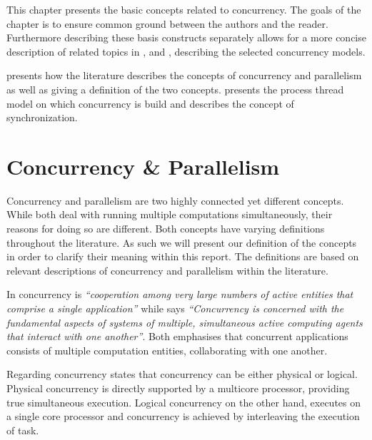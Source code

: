 \makeatletter {}\makeatother
{}
This chapter presents the basic concepts related to concurrency. The goals of the chapter is to ensure common ground between the authors and the reader. Furthermore describing these basis constructs separately allows for a more concise description of related topics in ,  and , describing the selected concurrency models. 

 presents how the literature describes the concepts of concurrency and parallelism as well as giving a definition of the two concepts.  presents the process thread model on which concurrency is build and  describes the concept of synchronization.
\section{Concurrency \& Parallelism}\label{sec:concurrency_parallelism}
Concurrency and parallelism are two highly connected yet different concepts. While both deal with running multiple computations simultaneously, their reasons for doing so are different. Both concepts have varying definitions throughout the literature. As such we will present our definition of the concepts in order to clarify their meaning within this report. The definitions are based on relevant descriptions of concurrency and parallelism within the literature.

In \cite[p. 330]{papadopoulos1998coordination} concurrency is \textit{``cooperation among very large numbers of active entities that comprise a single application''} while \cite[p. 607]{cleaveland1996strategic}
says \textit{``Concurrency is concerned with the fundamental aspects of systems of multiple, simultaneous active computing agents that interact with one another''}. Both emphasises that concurrent applications consists of multiple computation entities, collaborating with one another.

Regarding concurrency \cite[p. 579]{sebestaProLang} states that concurrency can be either physical or logical. Physical concurrency is directly supported by a multicore processor, providing true simultaneous execution. Logical concurrency on the other hand, executes on a single core processor and concurrency is achieved by interleaving the execution of task.

